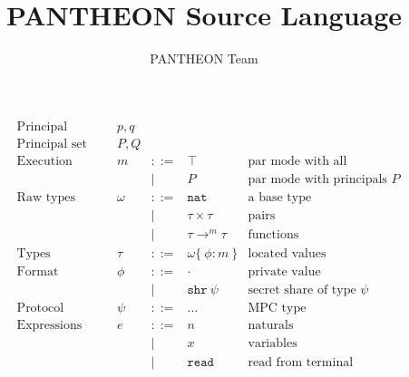 \documentclass[10pt]{article}
\title{PANTHEON Source Language}
\author{PANTHEON Team}
\newcommand{\kw}[1]{\ensuremath{\mathtt{#1}}}
\newcommand{\tnat}{\ensuremath{\mathtt{nat}}}
\newcommand{\tlist}[1]{\ensuremath{\mathtt{list}~{#1}}}
\newcommand{\tfun}[3]{\ensuremath{{#1} \rightarrow^{#3} {#2}}}
\newcommand{\tprod}[2]{\ensuremath{{#1} \times {#2}}}
\newcommand{\tsum}[2]{\ensuremath{{#1} + {#2}}}
\newcommand{\ssec}{\ensuremath{\mathtt{\cdot}}}
\newcommand{\isec}{\ensuremath{\mathtt{pmap}}}
\newcommand{\sshare}[1]{\ensuremath{\mathtt{shr}~{#1}}}
\newcommand{\sectyp}[3]{\ensuremath{{#1} \{~{#2}:{#3}~\}}}
\newcommand{\econcat}[2]{\ensuremath{{#1} +\!\!+~ {#2}}}
\newcommand{\eaccval}[2]{\ensuremath{{#1}.{#2}}}
\newcommand{\eread}{\ensuremath{\kw{read}}}
\begin{document}
\maketitle

\begin{figure}[h]
  \centering
  \[\begin{array}{rlcll}
      \text{Principal} & p, q \\
      \text{Principal set} & P, Q \\
    \text{Execution modes} & m  & ::=  & \top & \text{par mode with all principals}\\
                 && \mid & P & \text{par mode with principals $P$} \\      
      \text{Raw types} & \omega  & ::=  & \tnat & \text{a base type} \\      
                       && \mid & \tprod{\tau}{\tau} & \text{pairs} \\
                       && \mid & \tfun{\tau}{\tau}{m} & \text{functions} \\
      \text{Types} & \tau & ::= &
                                 \sectyp\omega\phi{m} & \text{located values} \\
      \text{Format} & \phi & ::= & \ssec & \text{private value}  \\
                       && \mid & \sshare{\psi} & \text{secret share of type $\psi$} \\
      \text{Protocol} & \psi & ::= & ... & \text{MPC type} \\
      \text{Expressions} & e & ::= & n & \text{naturals} \\
                       && \mid & x & \text{variables} \\
                       && \mid & \eread & \text{read from terminal}\\

\end{array}\]
\end{figure}
\end{document}
